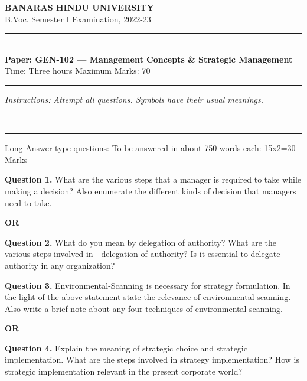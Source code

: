 \documentclass[11pt,a4paper]{article}
\begin{document}
\begin{center}
  {\large\bfseries BANARAS HINDU UNIVERSITY}\\[2pt]
  {
\normalsize B.Voc. Semester I Examination, 2022-23}\\[6pt]
  \rule{0.8\linewidth}{0.5pt}\\[6pt]
  {\large\bfseries Paper: GEN-102 --- Management Concepts \& Strategic Management}\\[4pt]
  {
\normalsize Time: Three hours \hfill Maximum Marks: 70}
\end{center}

\rule{\linewidth}{0.4pt}

\smallskip



\noindent   \textit{Instructions: Attempt all questions. Symbols have their usual meanings.}

\bigskip


\bigskip


\\[4pt]
\rule{\linewidth}{0.4pt}\smallskip

Long Answer type questions:
To be answered in about 750 words each: 15x2=30 Marks

\medskip


\noindent   \textbf{Question 1.} What are the various steps that a manager is required to take while making a decision?
Also enumerate the different kinds of decision that managers need to take.
\centerline{   \textbf{OR}}

\medskip


\noindent   \textbf{Question 2.} What do you mean by delegation of authority? What are the various steps involved in
- delegation of authority? Is it essential to delegate authority in any organization?

\medskip


\noindent   \textbf{Question 3.} Environmental-Scanning is necessary for strategy formulation. In the light of the
above statement state the relevance of environmental scanning. Also write a brief note about any four
techniques of environmental scanning.
\centerline{   \textbf{OR}}

\medskip


\noindent   \textbf{Question 4.} Explain the meaning of strategic choice and strategic implementation. What are the
steps involved in strategy implementation? How is strategic implementation relevant in the present
corporate world?
\end{document}
